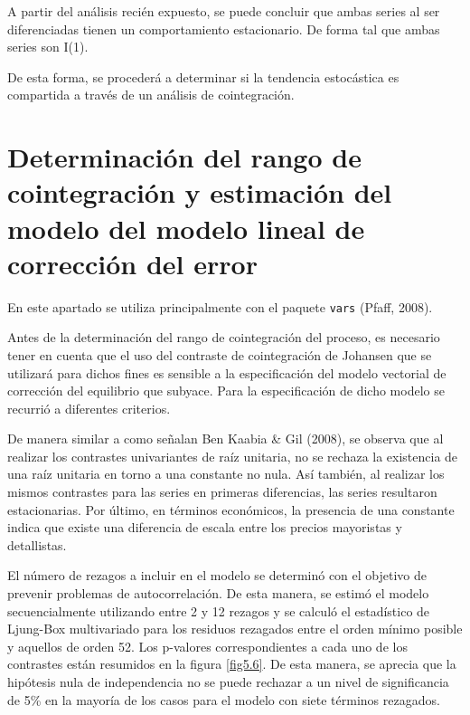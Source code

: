 \documentclass[12pt, twoside]{book}\usepackage[]{graphicx}\usepackage[]{color}
\numberwithin{equation}{section}
\numberwithin{theorem}{section}
\numberwithin{teorema}{section}
\numberwithin{defi}{section}
\numberwithin{prop}{section}
\numberwithin{defi}{section}
\theoremstyle{plain}
\begin{document}
A partir del análisis recién expuesto, se puede concluir que ambas series al ser diferenciadas tienen un comportamiento estacionario. De forma tal que ambas series son I(1).

De esta forma, se procederá a determinar si la tendencia estocástica es compartida a través de un análisis de cointegración. 

\section{Determinación del rango de cointegración y estimación del modelo del modelo lineal de corrección del error}

En este apartado se utiliza principalmente con el paquete \texttt{vars} (Pfaff, 2008). 



Antes de la determinación del rango de cointegración del proceso, es necesario tener en cuenta que el uso del contraste de cointegración de Johansen que se utilizará para dichos fines es sensible a la especificación del modelo vectorial de corrección del equilibrio que subyace. Para la especificación de dicho modelo se recurrió a diferentes criterios. 

De manera similar a como señalan Ben Kaabia \& Gil (2008), se observa que al realizar los contrastes univariantes de raíz unitaria, no se rechaza la existencia de una raíz unitaria en torno a una constante no nula. Así también, al realizar los mismos contrastes para las series en primeras diferencias, las series resultaron estacionarias. Por último, en términos económicos, la presencia de una constante indica que existe una diferencia de escala entre los precios mayoristas y detallistas. 

El número de rezagos a incluir en el modelo se determinó con el objetivo de prevenir problemas de autocorrelación. De esta manera, se estimó el modelo secuencialmente utilizando entre 2 y  12 rezagos y se calculó el estadístico de Ljung-Box multivariado para los residuos rezagados entre el orden mínimo posible y aquellos de orden 52. Los p-valores correspondientes a cada uno de los contrastes están resumidos en la figura \ref{fig5.6}. De esta manera, se aprecia que la hipótesis nula de independencia no se puede rechazar a un nivel de significancia de 5\% en la mayoría de los casos para el modelo con siete términos rezagados. 
\end{document}
